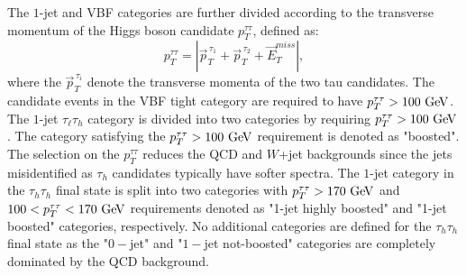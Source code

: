 The $1$-jet and VBF categories are further divided according to the transverse momentum of the Higgs boson candidate $p_{T}^{\tau\tau}$, defined as: 
\begin{equation} \label{eq:hpt}
p_{T}^{\tau\tau} = |\vec{p}_{T}^{\,\tau_1} + \vec{p}_{T}^{\,\tau_2} + \vec{E}_{T}^{miss}|,
\end{equation}
where the $\vec{p}_{T}^{\,\tau_i}$ denote the transverse momenta of the two tau candidates. The candidate events in the VBF tight category are required to have $p_{T}^{\tau\tau}>100~\mathrm{Ge\kern -0.1em V}$. The $1$-jet $\tau_{\ell}\tau_h$ category is divided into two categories by requiring $p_{T}^{\tau\tau}>100~\mathrm{Ge\kern -0.1em V}$. The category satisfying the $p_{T}^{\tau\tau}>100~\mathrm{Ge\kern -0.1em V}$ requirement is denoted as "boosted". The selection on the $p_{T}^{\tau\tau}$ reduces the QCD and $W$+jet backgrounds since the jets misidentified as $\tau_h$ candidates typically have softer spectra. The $1$-jet category in the $\tau_h\tau_h$ final state is split into two categories with $p_{T}^{\tau\tau}>170~\mathrm{Ge\kern -0.1em V}$ and $100<p_{T}^{\tau\tau}<170~\mathrm{Ge\kern -0.1em V}$ requirements denoted as "1-jet highly boosted" and "1-jet boosted" categories, respectively.  No additional categories are defined for the  $\tau_h\tau_h$ final state as the "$0-$jet" and "$1-$jet not-boosted" categories are completely dominated by the QCD background.  

